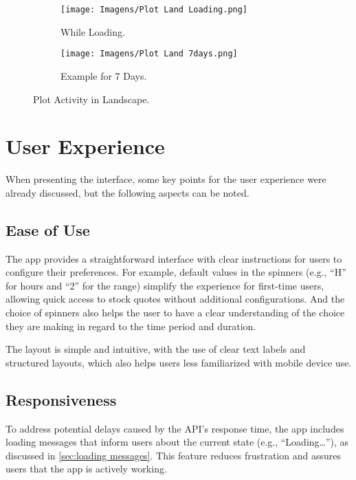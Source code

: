 \documentclass{article}
\begin{document}
\begin{figure}[ht]
    \centering
    \begin{subfigure}[t]{0.8\textwidth}
        \centering
        \texttt{[image: Imagens/Plot Land Loading.png]}
        \caption{While Loading.}
        \label{fig:plot land loading}
    \end{subfigure}
    
    \vspace{1em} 

    \begin{subfigure}[t]{0.8\textwidth} 
        \centering
        \texttt{[image: Imagens/Plot Land 7days.png]}
        \caption{Example for 7 Days.}
        \label{fig:plot land 7 days}
    \end{subfigure}

    \caption{Plot Activity in Landscape.}
    \label{fig:plot land}
\end{figure}

\section{User Experience}
When presenting the interface, some key points for the user experience were already discussed, but the following aspects can be noted.

\subsection{Ease of Use}
The app provides a straightforward interface with clear instructions for users to configure their preferences.
For example, default values in the spinners (e.g., “H” for hours and “2” for the range) simplify the experience for first-time users, allowing quick access to stock quotes without additional configurations.
And the choice of spinners also helps the user to have a clear understanding of the choice they are making in regard to the time period and duration.

The layout is simple and intuitive, with the use of clear text labels and structured layouts, which also helps users less familiarized with mobile device use.

\subsection{Responsiveness}
To address potential delays caused by the API’s response time, the app includes loading messages that inform users about the current state (e.g., “Loading…”), as discussed in \autoref{sec:loading messages}. 
This feature reduces frustration and assures users that the app is actively working.
\end{document}
